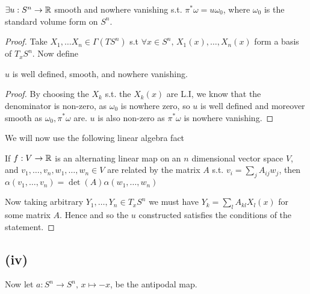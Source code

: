 \documentclass{article}
\begin{document}
\begin{prop}
$\exists u : S^n \to \mathbb{R}$ smooth and nowhere vanishing s.t. $\pi^\ast \omega = u \omega_0$, where $\omega_0$ is the standard volume form on $S^n$. 
\end{prop}
\begin{proof}
Take $X_1, \dots X_n \in \Gamma(T S^n)$ s.t $\forall x \in S^n, \, X_1(x), \dots, X_n(x)$ form a basis of $T_x S^n$. Now define
\begin{claim}
$u$ is well defined, smooth, and nowhere vanishing.
\end{claim}
\begin{proof}
By choosing the $X_k$ s.t. the $X_k(x)$ are L.I, we know that the denominator is non-zero, as $\omega_0$ is nowhere zero, so $u$ is well defined and moreover smooth as $\omega_0, \pi^\ast \omega$ are. $u$ is also non-zero as $\pi^\ast \omega$ is nowhere vanishing. 
\end{proof}
We will now use the following linear algebra fact
\begin{fact}
If $f : V \to \mathbb{R}$ is an alternating linear map on an $n$ dimensional vector space $V$, and $v_1, \dots, v_n, w_1, \dots, w_n \in V$ are related by the matrix $A$ s.t. $v_i = \sum_j A_{ij} w_j$, then $\alpha(v_1, \dots, v_n)=\det(A) \alpha(w_1, \dots, w_n)$
\end{fact}
Now taking arbitrary $Y_1, \dots, Y_n \in T_x S^n$ we must have $Y_k = \sum_{l} A_{kl} X_l(x) $ for some matrix $A$. Hence  
and so the $u$ constructed satisfies the conditions of the statement. 
\end{proof}

\subsection{(iv)}

Now let $a: S^n \to S^n, \, x \mapsto -x$, be the antipodal map. 
\end{document}
